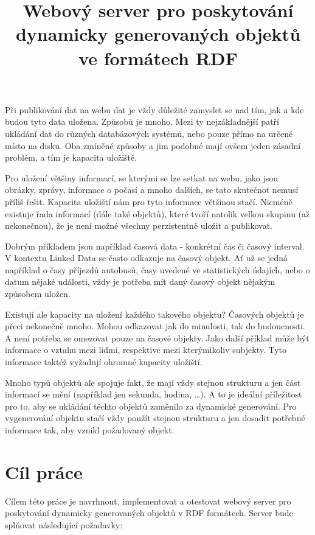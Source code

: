 \documentclass[thesis=B,czech]{FITthesis}[2012/06/26]
\title{Webový server pro poskytování dynamicky generovaných objektů ve formátech RDF}
\begin{document}

\begin{introduction}
\paragraph{}
Při publikování dat na webu dat je vždy důležité zamyslet se nad tím, jak a kde budou tyto data uložena.
Způsobů je mnoho. Mezi ty nejzákladnější patří ukládání dat do různých databázových systémů, nebo pouze přímo na určené místo na disku.
Oba zmíněné způsoby a jim podobné mají ovšem jeden zásadní problém, a tím je kapacita uložiště.

Pro uložení většiny informací, se kterými se lze setkat na webu, jako jsou obrázky, zprávy, informace o počasí a mnoho dalších, se tato skutečnot nemusí příliš řešit.
Kapacita uložiští nám pro tyto informace většinou stačí. Nicméně existuje řada informací (dále také objektů), které tvoří natolik velkou skupinu (až nekonečnou),
že je není možné všechny perzistentně uložit a publikovat.

Dobrým příkladem jsou například časová data - konkrétní čas či časový interval. V kontextu Linked Data \cite{linked_data} se často odkazuje na časový objekt.
Ať už se jedná například o časy příjezdů autobusů, časy uvedené ve statistických údajích,
nebo o datum nějaké události, vždy je potřeba mít daný časový objekt nějakým způsobem uložen.

Existují ale kapacity na uložení každého takového objektu? Časových objektů je přeci nekonečně mnoho. Mohou odkazovat jak do minulosti, tak do budoucnosti.
A není potřeba se omezovat pouze na časové objekty. Jako další příklad může být informace o vztahu mezi lidmi, respektive mezi kterýmikoliv subjekty.
Tyto informace taktéž vyžadují ohromné kapacity uložiští.

Mnoho typů objektů ale spojuje fakt, že mají vždy stejnou strukturu a jen část informací se mění (například jen sekunda, hodina, \ldots).
A to je ideální příležitost pro to, aby se ukládání těchto objektů zaměnilo za dynamické generování. Pro vygenerování objektu stačí vždy použít stejnou strukturu
a jen dosadit potřebné informace tak, aby vznikl požadovaný objekt.

\end{introduction}

\chapter{Cíl práce}
Cílem této práce je navrhnout, implementovat a otestovat webový server pro poskytování dynamicky generovaných objektů v RDF formátech.
Server bude splňovat následující požadavky:
\end{document}
